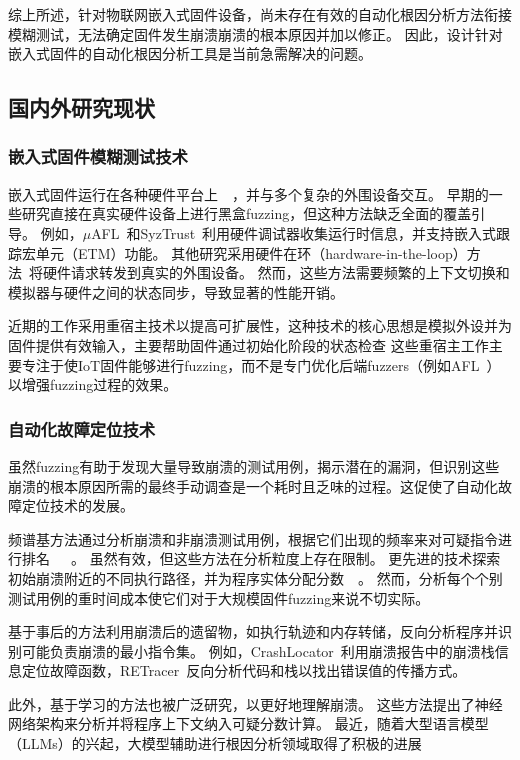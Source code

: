 综上所述，针对物联网嵌入式固件设备，尚未存在有效的自动化根因分析方法衔接模糊测试，无法确定固件发生崩溃崩溃的根本原因并加以修正。
因此，设计针对嵌入式固件的自动化根因分析工具是当前急需解决的问题。


\subsection{国内外研究现状}
\subsubsection{嵌入式固件模糊测试技术}
嵌入式固件运行在各种硬件平台上~\cite{IoTFuzzer2018}~\cite{SOBER}，并与多个复杂的外围设备交互。
早期的一些研究直接在真实硬件设备上进行黑盒fuzzing，但这种方法缺乏全面的覆盖引导。
例如，$\mu$AFL~\cite{mu2022}和SyzTrust~\cite{SyzTrust2023}利用硬件调试器收集运行时信息，并支持嵌入式跟踪宏单元（ETM\cite{Embedded2011}）功能。
其他研究采用硬件在环（hardware-in-the-loop）方法~\cite{SURROGATES}将硬件请求转发到真实的外围设备。
然而，这些方法需要频繁的上下文切换和模拟器与硬件之间的状态同步，导致显著的性能开销。

近期的工作采用重宿主技术以提高可扩展性，这种技术的核心思想是模拟外设并为固件提供有效输入，主要帮助固件通过初始化阶段的状态检查
这些重宿主工作主要专注于使IoT固件能够进行fuzzing，而不是专门优化后端fuzzers（例如AFL~\cite{AFL}）以增强fuzzing过程的效果。
\subsubsection{自动化故障定位技术}
虽然fuzzing有助于发现大量导致崩溃的测试用例，揭示潜在的漏洞，但识别这些崩溃的根本原因所需的最终手动调查是一个耗时且乏味的过程。这促使了自动化故障定位技术的发展。

频谱基方法通过分析崩溃和非崩溃测试用例，根据它们出现的频率来对可疑指令进行排名~\cite{Accuracy}~\cite{Evaluation2006}~\cite{Empirical2005}。
虽然有效，但这些方法在分析粒度上存在限制。
更先进的技术探索初始崩溃附近的不同执行路径，并为程序实体分配分数~\cite{AURORA}~\cite{Statistical2007}。
然而，分析每个个别测试用例的重时间成本使它们对于大规模固件fuzzing来说不切实际。

基于事后的方法利用崩溃后的遗留物，如执行轨迹和内存转储，反向分析程序并识别可能负责崩溃的最小指令集。
例如，CrashLocator~\cite{CrashLocator2014}利用崩溃报告中的崩溃栈信息定位故障函数，RETracer~\cite{RETracer2016}反向分析代码和栈以找出错误值的传播方式。

此外，基于学习的方法也被广泛研究，以更好地理解崩溃。
这些方法提出了神经网络架构来分析并将程序上下文纳入可疑分数计算。
最近，随着大型语言模型（LLMs）的兴起，大模型辅助进行根因分析领域取得了积极的进展~\cite{How2024}~\cite{Large2024}

